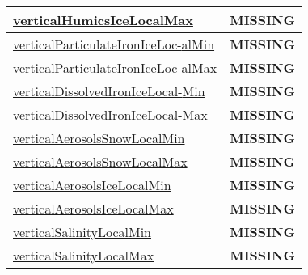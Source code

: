{\begin{center}
\begin{longtable}{| p{2.0in} | p{4.0in} |}
    \hline
    \hyperref[subsec:var_sec_tracer_monotonicity_verticalHumicsIceLocalMax]{verticalHumicsIceLocalMax} & {\bf \color{red} MISSING} \\
    \hline
    \hyperref[subsec:var_sec_tracer_monotonicity_verticalParticulateIronIceLocalMin]{verticalParticulateIronIceLoc-}\hyperref[subsec:var_sec_tracer_monotonicity_verticalParticulateIronIceLocalMin]{alMin  }& {\bf \color{red} MISSING} \\
    \hline
    \hyperref[subsec:var_sec_tracer_monotonicity_verticalParticulateIronIceLocalMax]{verticalParticulateIronIceLoc-}\hyperref[subsec:var_sec_tracer_monotonicity_verticalParticulateIronIceLocalMax]{alMax  }& {\bf \color{red} MISSING} \\
    \hline
    \hyperref[subsec:var_sec_tracer_monotonicity_verticalDissolvedIronIceLocalMin]{verticalDissolvedIronIceLocal-}\hyperref[subsec:var_sec_tracer_monotonicity_verticalDissolvedIronIceLocalMin]{Min  }& {\bf \color{red} MISSING} \\
    \hline
    \hyperref[subsec:var_sec_tracer_monotonicity_verticalDissolvedIronIceLocalMax]{verticalDissolvedIronIceLocal-}\hyperref[subsec:var_sec_tracer_monotonicity_verticalDissolvedIronIceLocalMax]{Max  }& {\bf \color{red} MISSING} \\
    \hline
    \hyperref[subsec:var_sec_tracer_monotonicity_verticalAerosolsSnowLocalMin]{verticalAerosolsSnowLocalMin} & {\bf \color{red} MISSING} \\
    \hline
    \hyperref[subsec:var_sec_tracer_monotonicity_verticalAerosolsSnowLocalMax]{verticalAerosolsSnowLocalMax} & {\bf \color{red} MISSING} \\
    \hline
    \hyperref[subsec:var_sec_tracer_monotonicity_verticalAerosolsIceLocalMin]{verticalAerosolsIceLocalMin} & {\bf \color{red} MISSING} \\
    \hline
    \hyperref[subsec:var_sec_tracer_monotonicity_verticalAerosolsIceLocalMax]{verticalAerosolsIceLocalMax} & {\bf \color{red} MISSING} \\
    \hline
    \hyperref[subsec:var_sec_tracer_monotonicity_verticalSalinityLocalMin]{verticalSalinityLocalMin} & {\bf \color{red} MISSING} \\
    \hline
    \hyperref[subsec:var_sec_tracer_monotonicity_verticalSalinityLocalMax]{verticalSalinityLocalMax} & {\bf \color{red} MISSING} \\
    \hline
\end{longtable}
\end{center}
}
